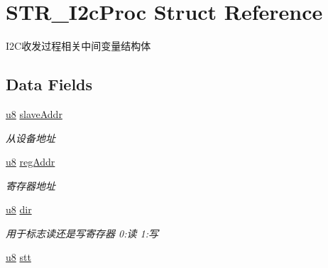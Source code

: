 \hypertarget{struct_s_t_r___i2c_proc}{\section{\-S\-T\-R\-\_\-\-I2c\-Proc \-Struct \-Reference}
\label{struct_s_t_r___i2c_proc}
}


\-I2\-C收发过程相关中间变量结构体  


\subsection*{\-Data \-Fields}
\begin{DoxyCompactItemize}
\item 
\hypertarget{struct_s_t_r___i2c_proc_a854a07ef2984c401cad2427cc51c93fa}{\hyperlink{group___b_s_p_gaed742c436da53c1080638ce6ef7d13de}{u8} \hyperlink{struct_s_t_r___i2c_proc_a854a07ef2984c401cad2427cc51c93fa}{slave\-Addr}}\label{struct_s_t_r___i2c_proc_a854a07ef2984c401cad2427cc51c93fa}

\begin{DoxyCompactList}\small\item\em 从设备地址 \end{DoxyCompactList}\item 
\hypertarget{struct_s_t_r___i2c_proc_adb730252ccdbdf412597e5bd074e69ec}{\hyperlink{group___b_s_p_gaed742c436da53c1080638ce6ef7d13de}{u8} \hyperlink{struct_s_t_r___i2c_proc_adb730252ccdbdf412597e5bd074e69ec}{reg\-Addr}}\label{struct_s_t_r___i2c_proc_adb730252ccdbdf412597e5bd074e69ec}

\begin{DoxyCompactList}\small\item\em 寄存器地址 \end{DoxyCompactList}\item 
\hypertarget{struct_s_t_r___i2c_proc_ae26b0cd8e52a77fbd75ff074e5274d6c}{\hyperlink{group___b_s_p_gaed742c436da53c1080638ce6ef7d13de}{u8} \hyperlink{struct_s_t_r___i2c_proc_ae26b0cd8e52a77fbd75ff074e5274d6c}{dir}}\label{struct_s_t_r___i2c_proc_ae26b0cd8e52a77fbd75ff074e5274d6c}

\begin{DoxyCompactList}\small\item\em 用于标志读还是写寄存器 0\-:读 1\-:写 \end{DoxyCompactList}\item 
\hypertarget{struct_s_t_r___i2c_proc_a80fabf8814bb01529f412455604bd324}{\hyperlink{group___b_s_p_gaed742c436da53c1080638ce6ef7d13de}{u8} \hyperlink{struct_s_t_r___i2c_proc_a80fabf8814bb01529f412455604bd324}{stt}}\label{struct_s_t_r___i2c_proc_a80fabf8814bb01529f412455604bd324}


\end{DoxyCompactItemize}
